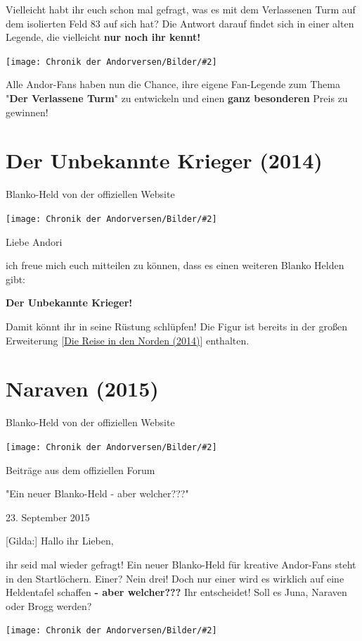 \documentclass[10pt, a4paper, oneside]{book}
\newcommand{\fillbreak}{\vspace*{\fill}\columnbreak}
\newcommand{\produkt}[1]{%
    \section{#1}%
    \label{Produkt: #1}%
}
\newcommand{\refprodukt}[1]{\hyperref[Produkt: #1]{#1}}
\newcommand{\bildmitts}[2][height=0.32\textwidth,width=0.48\textwidth,keepaspectratio]{%
    \begin{center}
        \texttt{[image: Chronik der Andorversen/Bilder/\#2]}
    \end{center}
}
\begin{document}
\begin{multicols}{2}
Vielleicht habt ihr euch schon mal gefragt, was es mit dem Verlassenen Turm auf dem isolierten Feld 83 auf sich hat? Die Antwort darauf findet sich in einer alten Legende, die vielleicht \textbf{nur noch ihr kennt!}

\bildmitts{Das Geheimnis des Verlassenen Turms.jpeg}

Alle Andor-Fans haben nun die Chance, ihre eigene Fan-Legende zum Thema "\textbf{Der Verlassene Turm}" zu entwickeln und einen \textbf{ganz besonderen} Preis zu gewinnen! 







\produkt{Der Unbekannte Krieger (2014)}

\begin{center}
    Blanko-Held von der offiziellen Website
\end{center}


\bildmitts{Der unbekannte Krieger.jpg}

Liebe Andori

ich freue mich euch mitteilen zu können, dass es einen weiteren Blanko Helden gibt:

\textbf{Der Unbekannte Krieger!}


Damit könnt ihr in seine Rüstung schlüpfen!
Die Figur ist bereits in der großen Erweiterung [\refprodukt{Die Reise in den Norden (2014)}] enthalten.


\fillbreak
\produkt{Naraven (2015)}

\begin{center}
    Blanko-Held von der offiziellen Website
\end{center}

\bildmitts{Naraven und Koram.jpeg}


\begin{center}
    Beiträge aus dem offiziellen Forum

    "Ein neuer Blanko-Held - aber welcher???"

    23. September 2015
\end{center}


[Gilda:] Hallo ihr Lieben,

ihr seid mal wieder gefragt! Ein neuer Blanko-Held für kreative Andor-Fans steht in den Startlöchern. Einer? Nein drei! Doch nur einer wird es wirklich auf eine Heldentafel schaffen \textbf{- aber welcher???} Ihr entscheidet! Soll es Juna, Naraven oder Brogg werden?

\bildmitts{Ein neuer Blanko Held.jpeg}


\end{multicols}
\end{document}
